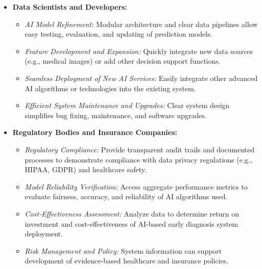 \begin{itemize}
    \item \textbf{Data Scientists and Developers:}
    \begin{itemize}
        \item \textit{AI Model Refinement:} Modular architecture and clear data pipelines allow easy testing, evaluation, and updating of prediction models.
        \item \textit{Feature Development and Expansion:} Quickly integrate new data sources (e.g., medical images) or add other decision support functions.
        \item \textit{Seamless Deployment of New AI Services:} Easily integrate other advanced AI algorithms or technologies into the existing system.
        \item \textit{Efficient System Maintenance and Upgrades:} Clear system design simplifies bug fixing, maintenance, and software upgrades.
    \end{itemize}

    \item \textbf{Regulatory Bodies and Insurance Companies:}
    \begin{itemize}
        \item \textit{Regulatory Compliance:} Provide transparent audit trails and documented processes to demonstrate compliance with data privacy regulations (e.g., HIPAA, GDPR) and healthcare safety.
        \item \textit{Model Reliability Verification:} Access aggregate performance metrics to evaluate fairness, accuracy, and reliability of AI algorithms used.
        \item \textit{Cost-Effectiveness Assessment:} Analyze data to determine return on investment and cost-effectiveness of AI-based early diagnosis system deployment.
        \item \textit{Risk Management and Policy:} System information can support development of evidence-based healthcare and insurance policies.
    \end{itemize}
\end{itemize}
